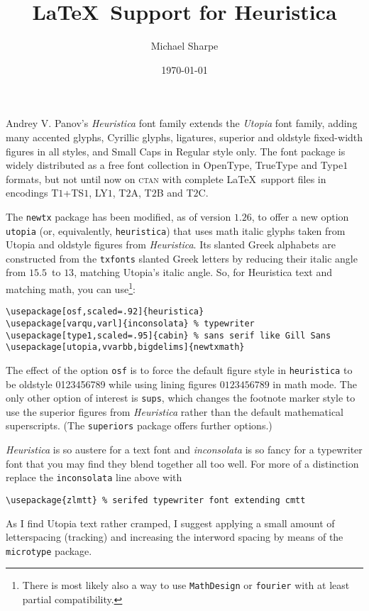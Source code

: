 \documentclass[11pt]{amsart}
\title{\LaTeX\ Support for Heuristica}
\author{Michael Sharpe}
\date{\today}  %
\begin{document}
\maketitle
Andrey V. Panov's \emph{Heuristica} font family extends the \emph{Utopia} font family, adding many accented glyphs, Cyrillic glyphs, ligatures, superior and oldstyle fixed-width figures in all styles, and Small Caps in Regular style only. The font package is widely distributed as a free font collection in OpenType, TrueType and Type$1$ formats, but not until now on \textsc{ctan} with complete \LaTeX\ support files in encodings T$1$+TS$1$, LY$1$, T$2$A, T$2$B and T$2$C.

The {\tt newtx} package has been modified, as of version $1.26$,  to offer a new option {\tt utopia} (or, equivalently, {\tt heuristica}) that uses math italic glyphs taken from Utopia and oldstyle figures from \emph{Heuristica}. Its slanted Greek alphabets are constructed from the {\tt txfonts} slanted Greek letters by reducing their italic angle from $15.5$\textdegree\ to $13$\textdegree, matching Utopia's italic angle. So, for Heuristica text and matching math, you can use\footnote{There is most likely also a way to use {\tt MathDesign} or {\tt fourier} with at least partial compatibility.}:
\begin{verbatim}
\usepackage[osf,scaled=.92]{heuristica}
\usepackage[varqu,varl]{inconsolata} % typewriter
\usepackage[type1,scaled=.95]{cabin} % sans serif like Gill Sans
\usepackage[utopia,vvarbb,bigdelims]{newtxmath}
\end{verbatim}
The effect of the option {\tt osf} is to force the default figure style in {\tt heuristica} to be oldstyle 0123456789 while using lining figures $0123456789$ in math mode. The only other option of interest is {\tt sups}, which changes the footnote marker style to use the superior figures from \emph{Heuristica} rather than the default mathematical superscripts. (The {\tt superiors} package offers further options.)

\emph{Heuristica} is so austere for a text font and \emph{inconsolata} is so fancy for a typewriter font that you may find they blend together all too well. For more of a distinction replace the {\tt inconsolata} line above with
\begin{verbatim}
\usepackage{zlmtt} % serifed typewriter font extending cmtt
\end{verbatim}

As I find Utopia text rather cramped, I suggest applying a small amount of letterspacing (tracking) and increasing the interword spacing by means of the {\tt microtype} package.
\end{document}
